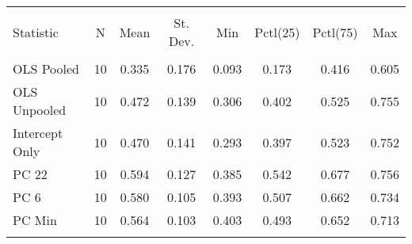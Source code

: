 
\begin{table}[!htbp] \centering 
  \caption{} 
  \label{} 
\begin{tabular}{@{\extracolsep{5pt}}lccccccc} 
\\[-1.8ex]\hline 
\hline \\[-1.8ex] 
Statistic & \multicolumn{1}{c}{N} & \multicolumn{1}{c}{Mean} & \multicolumn{1}{c}{St. Dev.} & \multicolumn{1}{c}{Min} & \multicolumn{1}{c}{Pctl(25)} & \multicolumn{1}{c}{Pctl(75)} & \multicolumn{1}{c}{Max} \\ 
\hline \\[-1.8ex] 
OLS Pooled & 10 & 0.335 & 0.176 & 0.093 & 0.173 & 0.416 & 0.605 \\ 
OLS Unpooled & 10 & 0.472 & 0.139 & 0.306 & 0.402 & 0.525 & 0.755 \\ 
Intercept Only & 10 & 0.470 & 0.141 & 0.293 & 0.397 & 0.523 & 0.752 \\ 
PC 22 & 10 & 0.594 & 0.127 & 0.385 & 0.542 & 0.677 & 0.756 \\ 
PC 6 & 10 & 0.580 & 0.105 & 0.393 & 0.507 & 0.662 & 0.734 \\ 
PC Min & 10 & 0.564 & 0.103 & 0.403 & 0.493 & 0.652 & 0.713 \\ 
\hline \\[-1.8ex] 
\end{tabular} 
\end{table} 
